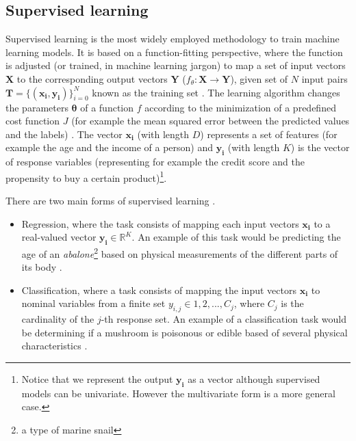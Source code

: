 \subsection{Supervised learning}
Supervised learning is the most widely employed methodology to train machine learning models. It is based on a function-fitting perspective, where the function is adjusted (or trained, in machine learning jargon) to map a set of input vectors $\mathbf{X}$ to the corresponding output vectors $\mathbf{Y}$ ($f_\theta:\mathbf{X}\rightarrow \mathbf{Y}$), given set of $N$ input pairs $\mathbf{T}=\{(\mathbf{x_i},\mathbf{y_i})\}_{i=0}^{N}$ known as the training set \autocite{theodoridis2015}. The learning algorithm changes the parameters $\mathbf{\theta}$ of a function $f$ according to the minimization of a predefined cost function $J$ (for example the mean squared error between the predicted values and the labels) \autocite{hastie2009}. The vector $\mathbf{x_i}$ (with length $D$) represents a set of features (for example the age and the income of a person)  and $\mathbf{y_i}$ (with length $K$) is the vector of response variables (representing for example the credit score and the propensity to buy a certain product)\footnote{Notice that we represent the output $\mathbf{y_i}$ as a vector although supervised models can be univariate. However the multivariate form is a more general case.}.

There are two main forms of supervised learning  \autocite{murphy2012}.

\begin{itemize}
	\item Regression, where the task consists of mapping each input vectors $\mathbf{x_i}$ to a real-valued vector $\mathbf{y_i} \in \mathbb{R}^K$. An example of this task would be predicting the age of an \textit{abalone}\footnote{a type of marine snail} based on physical measurements of the different parts of its body \autocite{dua2019abalone}.
	\item Classification, where a task consists of mapping the input vectors $\mathbf{x_i}$ to nominal variables from a finite set $y_{i,j} \in {1,2,...,C_j}$, where $C_j$ is the cardinality of the $j$-th response set. An example of a classification task would be determining if a mushroom is poisonous or edible based of several physical characteristics \autocite{dua2019abalone}.
\end{itemize}

